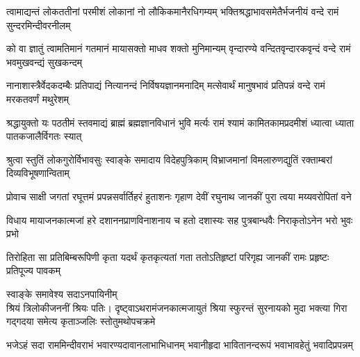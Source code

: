 \fourlineindentedshloka
{त्वामाद्यन्तं लोकततीनां परमीशं}
{लोकानां नो लौकिकमानैरधिगम्यम्}
{भक्तिश्रद्धाभावसमेतैर्भजनीयं}
{वन्दे रामं सुन्दरमिन्दीवरनीलम्} %

\fourlineindentedshloka
{को वा ज्ञातुं त्वामतिमानं गतमानं}
{मायासक्तो माधव शक्तो मुनिमान्यम्}
{वृन्दारण्ये वन्दितवृन्दारकवृन्दं}
{वन्दे रामं भवमुखवन्द्यं सुखकन्दम्} %

\fourlineindentedshloka
{नानाशास्त्रैर्वेदकदम्बैः प्रतिपाद्यं}
{नित्यानन्दं निर्विषयज्ञानमनादिम्}
{मत्सेवार्थं मानुषभावं प्रतिपन्नं}
{वन्दे रामं मरकतवर्णं मथुरेशम्} %

\fourlineindentedshloka
{श्रद्धायुक्तो यः पठतीमं स्तवमाद्यं}
{ब्राह्मं ब्रह्मज्ञानविधानं भुवि मर्त्यः}
{रामं श्यामं कामितकामप्रदमीशं}
{ध्यात्वा ध्याता पातकजालैर्विगतः स्यात्} %

\fourlineindentedshloka
{श्रुत्वा स्तुतिं लोकगुरोर्विभावसुः}
{स्वाङ्के समादाय विदेहपुत्रिकाम्}
{विभ्राजमानां विमलारुणद्युतिं}
{रक्ताम्बरां दिव्यविभूषणान्विताम्} %

\fourlineindentedshloka
{प्रोवाच साक्षी जगतां रघूत्तमं}
{प्रपन्नसर्वार्तिहरं हुताशनः}
{गृहाण देवीं रघुनाथ जानकीं}
{पुरा त्वया मय्यवरोपितां वने} %

\fourlineindentedshloka
{विधाय मायाजनकात्मजां हरे}
{दशाननप्राणविनाशनाय च}
{हतो दशास्यः सह पुत्रबान्धवैः}
{निराकृतोऽनेन भरो भुवः प्रभो} %

\fourlineindentedshloka
{तिरोहिता सा प्रतिबिम्बरूपिणी}
{कृता यदर्थं कृतकृत्यतां गता}
{ततोऽतिहृष्टां परिगृह्य जानकीं}
{रामः प्रहृष्टः प्रतिपूज्य पावकम्} %

\begin{minipage}{\linewidth}
\centering%
{\hspace{-7ex}स्वाङ्के समावेश्य सदाऽनपायिनीम्}\\
{\hspace{-1ex}श्रियं त्रिलोकीजननीं श्रियः पतिः।}
\fourlineindentedshloka
{दृष्ट्वाऽथ\hspace{1.3ex}रामं\hspace{1.3ex}जनकात्मजायुतं}
{श्रिया स्फुरन्तं सुरनायको मुदा}
{भक्त्या गिरा गद्गदया समेत्य}
{कृताञ्जलिः \hspace{1.5ex}स्तोतुमथोपचक्रमे} %
\end{minipage}

\begin{minipage}{\linewidth}

\fourlineindentedshloka
{भजेऽहं सदा राममिन्दीवराभं}
{भवारण्यदावानलाभाभिधानम्}
{भवानीहृदा भावितानन्दरूपं}
{भवाभावहेतुं भवादिप्रपन्नम्} %
\end{minipage}

